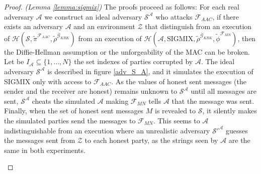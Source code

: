 \documentclass{acm_proc_article-sp}
\begin{document}
\begin{proof}
\textit{(Lemma \ref{lemma:sigmix})}
The proofs proceed as follows: For each real adversary $\mathcal{A}$ we construct an ideal adversary
$\mathcal{S^A}$ who attacks $\mathcal{F}_{AAC}$,
if there exists an adversary $\mathcal{A}$ and an environment $\mathcal{Z}$ that distinguish from an
execution of
$\mathcal{H}(\mathcal{S},
             \tilde{\pi}^{\mathcal{F}_{AAC}},
             \tilde{\rho}^{\bar{\mathcal{G}}_{KRK}})$
from an execution of
$\mathcal{H}(\mathcal{A},
             \textrm{SIGMIX}, 
             \tilde{\rho}^{\bar{\mathcal{G}}_{KRK}},
             \tilde{\phi}^{\mathcal{F}_{MN}})$,
then the Diffie-Hellman assumption or the unforgeability of the MAC can be
broken.\\
Let be $I_{\mathcal{A}} \subseteq \{1, \ldots, N\}$ the set indexes of parties corrupted by $\mathcal{A}$.
The ideal adversary $\mathcal{S^A}$ is described in figure \ref{adv_S_A}, and it simulates
the execution of SIGMIX only with access to $\mathcal{F}_{AAC}$. As the values of honest sent messages
(the sender and the receiver are honest) remains unknown to $\mathcal{S^A}$ until all messages are sent,
$\mathcal{S^A}$ cheats the simulated $\mathcal{A}$ making $\mathcal{F}_{MN}$ tells $\mathcal{A}$ that
the message was sent. Finally, when the set of honest sent messages $M$ is revealed to $\mathcal{S}$, it
silently makes the simulated parties send the messages to $\mathcal{F}_{MN}$. This seems to $\mathcal{A}$
indistinguishable from an execution where an unrealistic adversary $\mathcal{S}'^{\mathcal{A}}$ guesses
the messages sent from $\mathcal{Z}$ to each honest party, as the strings seen by $\mathcal{A}$ are the
same in both experiments.

\begin{figure}
\end{figure}
\end{proof}
\end{document}

